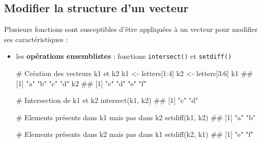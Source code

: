 \documentclass[12pt,twosided, notitlepage]{book}
\newenvironment{Shaded}{}{}
\newcommand{\KeywordTok}[1]{\textcolor[rgb]{0.00,0.00,1.00}{#1}}
\newcommand{\DecValTok}[1]{#1}
\newcommand{\StringTok}[1]{\textcolor[rgb]{0.00,0.50,0.50}{#1}}
\newcommand{\CommentTok}[1]{\textcolor[rgb]{0.00,0.50,0.00}{#1}}
\newcommand{\OperatorTok}[1]{#1}
\newcommand{\NormalTok}[1]{#1}
\renewenvironment{Shaded}{\begin{snugshade}}{\end{snugshade}}
\begin{document}
\subsection{Modifier la structure d'un
vecteur}\label{modifier-la-structure-dun-vecteur}

Plusieurs fonctions sont susceptibles d'être appliquées à un vecteur
pour modifier ses caractéristiques :

\begin{itemize}
\item
  les \textbf{opérations ensemblistes} : fonctions
  \texttt{intersect()} et
  \texttt{setdiff()}

\begin{Shaded}
\begin{Highlighting}[]
\CommentTok{# Création des vecteurs k1 et k2}
\NormalTok{k1 <-}\StringTok{ }\NormalTok{letters[}\DecValTok{1}\OperatorTok{:}\DecValTok{4}\NormalTok{]}
\NormalTok{k2 <-}\StringTok{ }\NormalTok{letters[}\DecValTok{3}\OperatorTok{:}\DecValTok{6}\NormalTok{]}
\NormalTok{k1}
\NormalTok{  ## [1] "a" "b" "c" "d"}
\NormalTok{k2}
\NormalTok{  ## [1] "c" "d" "e" "f"}

\CommentTok{# Intersection de k1 et k2}
\KeywordTok{intersect}\NormalTok{(k1, k2)}
\NormalTok{  ## [1] "c" "d"}

\CommentTok{# Elements présents dans k1 mais pas dans k2}
\KeywordTok{setdiff}\NormalTok{(k1, k2)}
\NormalTok{  ## [1] "a" "b"}

\CommentTok{# Elements présents dans k2 mais pas dans k1}
\KeywordTok{setdiff}\NormalTok{(k2, k1)}
\NormalTok{  ## [1] "e" "f"}
\end{Highlighting}
\end{Shaded}
\end{itemize}

~
\end{document}
